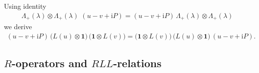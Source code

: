 \documentclass[11pt]{article}
\numberwithin{equation}{section}
\theoremstyle{plain}
\theoremstyle{definition}
\renewcommand{\imath}{\mathrm{i}}
\begin{document}
Using identity  
\begin{align*}
	\Lambda_{+}(\lambda)\otimes\Lambda_{+}(\lambda)\,\,\left(u-v  +\imath P\right) = 
	\left(u-v  +\imath P\right)\,\Lambda_{+}(\lambda)\otimes\Lambda_{+}(\lambda)
\end{align*}
we derive 
\begin{align*}
	\textstyle \left(u-v  +\imath P\right)\, \bigl(L(u)\otimes \bm{1}\bigr)\, 
	\bigl(\bm{1} \otimes L(v)\bigr)
	=  
	\bigl(\bm{1} \otimes L(v)\bigr)\,
	\bigl(L(u)\otimes \bm{1}\bigr)\, \left(u-v  +\imath P\right).
\end{align*}



\subsection{$R$-operators and $RLL$-relations}
\end{document}
